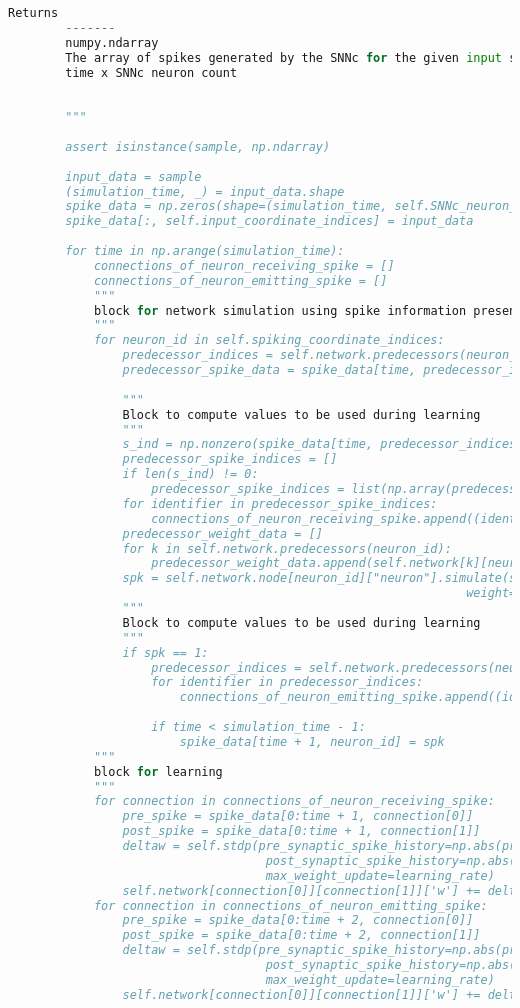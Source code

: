 \begin{lstlisting}[language=Python, caption={Python code for modular implementation of SNNc}]
		Returns
		-------
		numpy.ndarray
		The array of spikes generated by the SNNc for the given input sample. The dimension of the array is
		time x SNNc neuron count
	
	
		"""
	
		assert isinstance(sample, np.ndarray)
	
		input_data = sample
		(simulation_time, _) = input_data.shape
		spike_data = np.zeros(shape=(simulation_time, self.SNNc_neuron_count), dtype=int)
		spike_data[:, self.input_coordinate_indices] = input_data
	
		for time in np.arange(simulation_time):
			connections_of_neuron_receiving_spike = []
			connections_of_neuron_emitting_spike = []
			"""
			block for network simulation using spike information present in spike data
			"""
			for neuron_id in self.spiking_coordinate_indices:
				predecessor_indices = self.network.predecessors(neuron_id)
				predecessor_spike_data = spike_data[time, predecessor_indices]
	
				"""
				Block to compute values to be used during learning
				"""
				s_ind = np.nonzero(spike_data[time, predecessor_indices])[0]
				predecessor_spike_indices = []
				if len(s_ind) != 0:
					predecessor_spike_indices = list(np.array(predecessor_indices)[s_ind])
				for identifier in predecessor_spike_indices:
					connections_of_neuron_receiving_spike.append((identifier, neuron_id))
				predecessor_weight_data = []
				for k in self.network.predecessors(neuron_id):
					predecessor_weight_data.append(self.network[k][neuron_id]["w"])
				spk = self.network.node[neuron_id]["neuron"].simulate(spike_train=predecessor_spike_dat,
																weight=predecessor_weight_data)	
				"""
				Block to compute values to be used during learning
				"""
				if spk == 1:
					predecessor_indices = self.network.predecessors(neuron_id)
					for identifier in predecessor_indices:
						connections_of_neuron_emitting_spike.append((identifier, neuron_id))
	
					if time < simulation_time - 1:
						spike_data[time + 1, neuron_id] = spk
			"""
			block for learning
			"""
			for connection in connections_of_neuron_receiving_spike:
				pre_spike = spike_data[0:time + 1, connection[0]]
				post_spike = spike_data[0:time + 1, connection[1]]
				deltaw = self.stdp(pre_synaptic_spike_history=np.abs(pre_spike).tolist(),
									post_synaptic_spike_history=np.abs(post_spike).tolist(),
									max_weight_update=learning_rate)
				self.network[connection[0]][connection[1]]['w'] += deltaw
			for connection in connections_of_neuron_emitting_spike:
				pre_spike = spike_data[0:time + 2, connection[0]]
				post_spike = spike_data[0:time + 2, connection[1]]
				deltaw = self.stdp(pre_synaptic_spike_history=np.abs(pre_spike).tolist(),
									post_synaptic_spike_history=np.abs(post_spike).tolist(),
									max_weight_update=learning_rate)
				self.network[connection[0]][connection[1]]['w'] += deltaw
	

\end{lstlisting}
